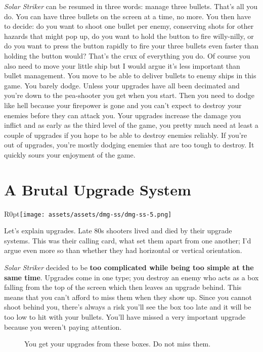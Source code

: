 \documentclass{book}
\begin{document}
\emph{Solar Striker} can be resumed in three words: manage three bullets. That’s all you do. You can have three bullets on the screen at a time, no more. You then have to decide: do you want to shoot one bullet per enemy, conserving shots for other hazards that might pop up, do you want to hold the button to fire willy-nilly, or do you want to press the button rapidly to fire your three bullets even faster than holding the button would? That’s the crux of everything you do. Of course you also need to move your little ship but I would argue it’s less important than bullet management. You move to be able to deliver bullets to enemy ships in this game. You barely dodge. Unless your upgrades have all been decimated and you’re down to the pea-shooter you get when you start. Then you need to dodge like hell because your firepower is gone and you can’t expect to destroy your enemies before they can attack you. Your upgrades increase the damage you inflict and as early as the third level of the game, you pretty much need at least a couple of upgrades if you hope to be able to destroy enemies reliably. If you’re out of upgrades, you’re mostly dodging enemies that are too tough to destroy. It quickly sours your enjoyment of the game.\par
\FloatBarrier\section*{A Brutal Upgrade System}
\begin{wrapfigure}{R}{0pt}{\texttt{[image: assets/assets/dmg-ss/dmg-ss-5.png]}}\end{wrapfigure}
Let’s explain upgrades. Late 80s shooters lived and died by their upgrade systems. This was their calling card, what set them apart from one another; I’d argue even more so than whether they had horizontal or vertical orientation.\par
\emph{Solar Striker} decided to be \textbf{too complicated while being too simple at the same time}. Upgrades come in one type; you destroy an enemy who acts as a box falling from the top of the screen which then leaves an upgrade behind. This means that you can’t afford to miss them when they show up. Since you cannot shoot behind you, there’s always a risk you’ll see the box too late and it will be too low to hit with your bullets. You’ll have missed a very important upgrade because you weren’t paying attention.\par
\FloatBarrier\vspace{\baselineskip}\begin{figure}[H]\caption*{You get your upgrades from these boxes. Do not miss them.}\end{figure}
\end{document}
